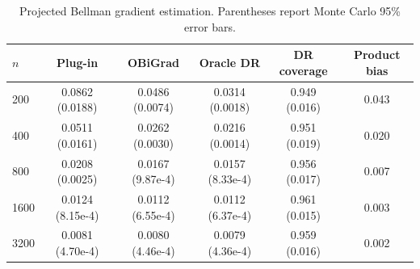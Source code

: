 \begin{table}[t]
\centering
\small
\setlength{\tabcolsep}{5pt}
\caption{Projected Bellman gradient estimation. Parentheses report Monte Carlo 95\% error bars.}
\label{tab:generated-bellman-b1-gradient}
\begin{tabular}{lccccc}
\toprule
$n$ & Plug-in & OBiGrad & Oracle DR & DR coverage & Product bias \\
\midrule
200 & 0.0862 (0.0188) & 0.0486 (0.0074) & 0.0314 (0.0018) & 0.949 (0.016) & 0.043 \\
400 & 0.0511 (0.0161) & 0.0262 (0.0030) & 0.0216 (0.0014) & 0.951 (0.019) & 0.020 \\
800 & 0.0208 (0.0025) & 0.0167 (9.87e-4) & 0.0157 (8.33e-4) & 0.956 (0.017) & 0.007 \\
1600 & 0.0124 (8.15e-4) & 0.0112 (6.55e-4) & 0.0112 (6.37e-4) & 0.961 (0.015) & 0.003 \\
3200 & 0.0081 (4.70e-4) & 0.0080 (4.46e-4) & 0.0079 (4.36e-4) & 0.959 (0.016) & 0.002 \\
\bottomrule
\end{tabular}
\end{table}
